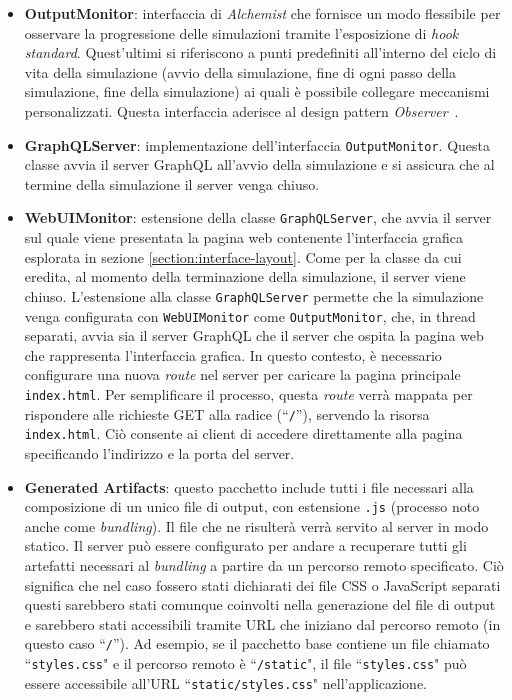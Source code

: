 \begin{itemize}
	\item \textbf{OutputMonitor}: interfaccia di \textit{Alchemist} che fornisce un modo flessibile per osservare la progressione delle simulazioni tramite l'esposizione di \textit{hook standard}.  Quest'ultimi si riferiscono a punti predefiniti all'interno del ciclo di vita della simulazione (avvio della simulazione, fine di ogni passo della simulazione, fine della simulazione) ai quali è possibile collegare meccanismi personalizzati. Questa interfaccia aderisce al design pattern \textit{Observer}~\cite{Gamma1994}.
	\item \textbf{GraphQLServer}: implementazione dell'interfaccia  \texttt{OutputMonitor}. Questa classe avvia il server GraphQL all'avvio della simulazione e si assicura che al termine della simulazione il server venga chiuso.
    \item \textbf{WebUIMonitor}: estensione della classe \texttt{GraphQLServer}, che avvia il server sul quale viene presentata la pagina web contenente l'interfaccia grafica esplorata in sezione \ref{section:interface-layout}. Come per la classe da cui eredita, al momento della terminazione della simulazione, il server viene chiuso. L'estensione alla classe \texttt{GraphQLServer} permette che la simulazione venga configurata con \texttt{WebUIMonitor} come \texttt{OutputMonitor}, che, in thread separati, avvia sia il server GraphQL che il server che ospita la pagina web che rappresenta l'interfaccia grafica.
    In questo contesto, è necessario configurare una nuova \textit{route} nel server per caricare la pagina principale \texttt{index.html}. Per semplificare il processo, questa \textit{route} verrà mappata per rispondere alle richieste GET alla radice (``\texttt{/}''), servendo la risorsa \texttt{index.html}. Ciò consente ai client di accedere direttamente alla pagina specificando l'indirizzo e la porta del server.
	\item \textbf{Generated Artifacts}: questo pacchetto include tutti i file necessari alla composizione di un unico file di output, con estensione \texttt{.js} (processo noto anche come \textit{bundling}). Il file che ne risulterà verrà servito al server in modo statico. Il server può essere configurato per andare a recuperare tutti gli artefatti necessari al \textit{bundling} a partire da un percorso remoto specificato. Ciò significa che nel caso fossero stati dichiarati dei file CSS o JavaScript separati questi sarebbero stati comunque coinvolti nella generazione del file di output e sarebbero stati accessibili tramite \ac{URL} che iniziano dal percorso remoto (in questo caso ``\texttt{/}'').	
	Ad esempio, se il pacchetto base contiene un file chiamato ``\texttt{styles.css}" e il percorso remoto è ``\texttt{/static}", il file ``\texttt{styles.css}" può essere accessibile all'URL ``\texttt{static/styles.css}" nell'applicazione. 
	
\end{itemize}


